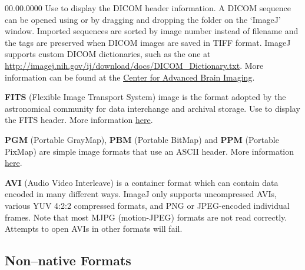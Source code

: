 \begin{lyxlist}{00.00.0000}
Use \textsf{}
to display the DICOM header information. A DICOM sequence can be opened
using \textsf{}
or by dragging and dropping the folder on the `ImageJ' window. Imported
sequences are sorted by image number instead of filename and the tags
are preserved when DICOM images are saved in TIFF format. ImageJ supports
custom DICOM dictionaries, such as the one at \url{http://imagej.nih.gov/ij/download/docs/DICOM_Dictionary.txt}.
More information can be found at the \href{http://www.cabiatl.com/mricro/dicom/index.html}{Center for Advanced Brain Imaging}.
\item [{\textbf{FITS}}] (Flexible Image Transport System) image is the
format adopted by the astronomical community for data interchange
and archival storage. Use \textsf{}
to display the FITS header. More information \href{http://fits.gsfc.nasa.gov}{here}.
\item [{\textbf{PGM}}] (Portable GrayMap), \textbf{PBM}
(Portable BitMap) and \textbf{PPM}
(Portable PixMap) are simple image formats that use an ASCII
header. More information \href{http://local.wasp.uwa.edu.au/~pbourke/dataformats/ppm/}{here}.
\item [{\textbf{AVI}}] (Audio Video Interleave) is a container format which
can contain data encoded in many different ways. ImageJ only supports
uncompressed AVIs, various YUV 4:2:2 compressed
formats, and PNG or JPEG-encoded individual
frames. Note that most MJPG
(motion-JPEG) formats are not read correctly. Attempts to open AVIs
in other formats will fail.
\end{lyxlist}



\subsection*{Non--native Formats \label{sub:Non-native-Supported-Formats}}

